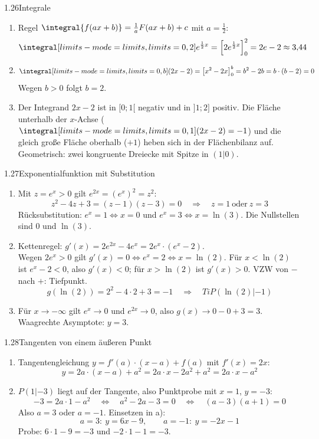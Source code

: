 \begin{loesung}{1.26}{Integrale}
\begin{enumerate}[label=\alph*)]
  \item Regel $\integral{f(ax+b)} = \frac{1}{a}F(ax+b)+c$ mit $a=\frac{1}{2}$:
  \[\integral[limits-mode=limits,limits={0, 2}]{e^{\frac{1}{2}x}} = \left[2e^{\frac{1}{2}x}\right]_0^2 = 2e-2\approx 3{,}44\]
  \item \[\integral[limits-mode=limits,limits={0, b}]{(2x-2)} = \left[x^2-2x\right]_0^b = b^2-2b = b\cdot(b-2) = 0\]
  Wegen $b>0$ folgt $b=2$.
  \item Der Integrand $2x-2$ ist in $[0;1[$ negativ und in $]1;2]$ positiv. Die Fläche unterhalb der $x$-Achse ($\integral[limits-mode=limits,limits={0, 1}]{(2x-2)} = -1$) und die gleich große Fläche oberhalb ($+1$) heben sich in der Flächenbilanz auf. Geometrisch: zwei kongruente Dreiecke mit Spitze in $(1|0)$.
\end{enumerate}
\end{loesung}

\begin{loesung}{1.27}{Exponentialfunktion mit Substitution}
\begin{enumerate}[label=\alph*)]
  \item Mit $z=e^x>0$ gilt $e^{2x} = (e^x)^2 = z^2$:
  \[z^2-4z+3 = (z-1)(z-3) = 0\quad\Longrightarrow\quad z=1\ \text{oder}\ z=3\]
  Rücksubstitution: $e^x=1\Longleftrightarrow x=0$ und $e^x=3\Longleftrightarrow x=\ln{(3)}$. Die Nullstellen sind $0$ und $\ln{(3)}$.
  \item Kettenregel: $g'(x) = 2e^{2x}-4e^x = 2e^x\cdot(e^x-2)$.\\
  Wegen $2e^x>0$ gilt $g'(x)=0\Longleftrightarrow e^x=2\Longleftrightarrow x=\ln{(2)}$. Für $x<\ln{(2)}$ ist $e^x-2<0$, also $g'(x)<0$; für $x>\ln{(2)}$ ist $g'(x)>0$. VZW von $-$ nach $+$: Tiefpunkt.
  \[g(\ln{(2)}) = 2^2-4\cdot 2+3 = -1\quad\Longrightarrow\quad TiP(\ln{(2)}|-1)\]
  \item Für $x\longrightarrow-\infty$ gilt $e^x\longrightarrow 0$ und $e^{2x}\longrightarrow 0$, also $g(x)\longrightarrow 0-0+3 = 3$. Waagrechte Asymptote: $y=3$.
\end{enumerate}
\end{loesung}

\begin{loesung}{1.28}{Tangenten von einem äußeren Punkt}
\begin{enumerate}[label=\alph*)]
  \item Tangentengleichung $y = f'(a)\cdot(x-a)+f(a)$ mit $f'(x)=2x$:
  \[y = 2a\cdot(x-a)+a^2 = 2a\cdot x-2a^2+a^2 = 2a\cdot x-a^2\]
  \item $P(1|-3)$ liegt auf der Tangente, also Punktprobe mit $x=1$, $y=-3$:
  \[-3 = 2a\cdot 1-a^2\quad\Longleftrightarrow\quad a^2-2a-3 = 0\quad\Longleftrightarrow\quad (a-3)(a+1) = 0\]
  Also $a=3$ oder $a=-1$. Einsetzen in a):
  \[a=3:\ y = 6x-9,\qquad a=-1:\ y = -2x-1\]
  Probe: $6\cdot 1-9 = -3$ und $-2\cdot 1-1 = -3$. \checkmark
\end{enumerate}
\end{loesung}

